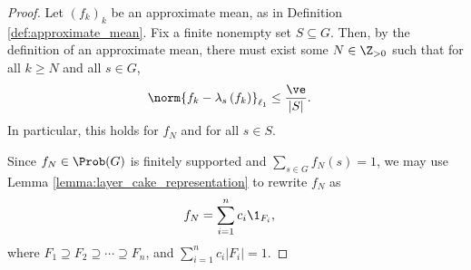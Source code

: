 \begin{proof}
  Let $\left(f_k\right)_k$ be an approximate mean, as in Definition \ref{def:approximate_mean}. Fix a finite nonempty set $S \subseteq G$. Then, by the definition of an approximate mean, there must exist some $N\in\N$ such that for all $k\geq N$ and all $s\in G$,
  \begin{align*}
    \norm{f_k - \lambda_s\left(f_k\right)}_{\ell_1} &\leq \frac{\ve}{|S|}.
  \end{align*}
  In particular, this holds for $f_N$ and for all $s\in S$.\newline

  Since $f_N\in \Prob(G)$ is finitely supported and $\sum_{s\in G}f_N(s) = 1$, we may use Lemma \ref{lemma:layer_cake_representation} to rewrite $f_N$ as
  \begin{align*}
    f_N &= \sum_{i=1}^{n}c_i\1_{F_i},
  \end{align*}
  where $F_1 \supseteq F_2\supseteq \cdots \supseteq F_n$, and $\sum_{i=1}^{n}c_i\left\vert F_i \right\vert = 1$.\newline


\end{proof}
